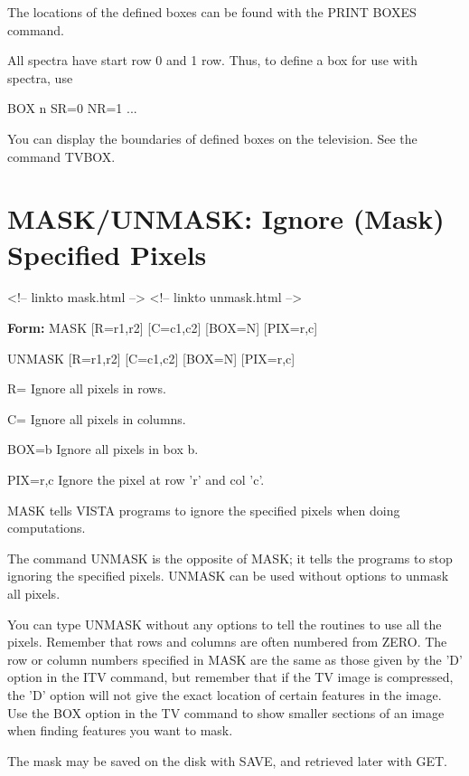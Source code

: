 The locations of the defined boxes can be found with the PRINT BOXES
command.

All spectra have start row 0 and 1 row.  Thus, to define a box for use with
spectra, use
\begin{hanging}
  \item{BOX n SR=0 NR=1 ...}
\end{hanging}

You can display the boundaries of defined boxes on the television. See the
command TVBOX.

\section{MASK/UNMASK: Ignore (Mask) Specified Pixels}
\begin{rawhtml}
<!-- linkto mask.html -->
<!-- linkto unmask.html -->
\end{rawhtml}
\begin{command}
  \item[\textbf{Form:} MASK {[R=r1,r2]} {[C=c1,c2]} {[BOX=N]} 
       {[PIX=r,c]}\hfill]{}
  \item[UNMASK  {[R=r1,r2]} {[C=c1,c2]} {[BOX=N]} {[PIX=r,c]}\hfill]{}
  \item[R=]{Ignore all pixels in rows.}
  \item[C=]{Ignore all pixels in columns.}
  \item[BOX=b]{Ignore all pixels in box b.}
  \item[PIX=r,c]{Ignore the pixel at row 'r' and col 'c'.}
\end{command}

MASK tells VISTA programs to ignore the specified pixels when doing
computations.

The command UNMASK is the opposite of MASK; it tells the programs to stop
ignoring the specified pixels.  UNMASK can be used without options to
unmask all pixels.

You can type UNMASK without any options to tell the routines to use all the
pixels.  Remember that rows and columns are often numbered from ZERO.  The
row or column numbers specified in MASK are the same as those given by the
'D' option in the ITV command, but remember that if the TV image is
compressed, the 'D' option will not give the exact location of certain
features in the image.  Use the BOX option in the TV command to show
smaller sections of an image when finding features you want to mask.

The mask may be saved on the disk with SAVE, and retrieved later with GET.

